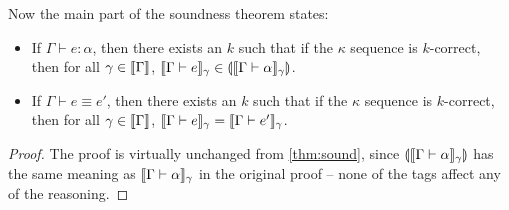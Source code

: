 Now the main part of the soundness theorem states:
\begin{theorem}[Soundness]\label{thm:sound2}
\begin{itemize}
\item If $\Gamma\vdash e:\alpha$, then there exists an $k$ such that if the $\kappa$ sequence is $k$-correct, then for all $\gamma\in\scott{\Gamma}$, $\scott{\Gamma\vdash e}_\gamma\in \ttag{\scott{\Gamma\vdash \alpha}_\gamma}$.
\item If $\Gamma\vdash e\equiv e'$, then there exists an $k$ such that if the $\kappa$ sequence is $k$-correct, then for all $\gamma\in\scott{\Gamma}$, $\scott{\Gamma\vdash e}_\gamma=\scott{\Gamma\vdash e'}_\gamma$.
\end{itemize}
\end{theorem}
\begin{proof}
The proof is virtually unchanged from \autoref{thm:sound}, since $\ttag{\scott{\Gamma\vdash \alpha}_\gamma}$ has the same meaning as $\scott{\Gamma\vdash \alpha}_\gamma$ in the original proof -- none of the tags affect any of the reasoning.
\end{proof}




